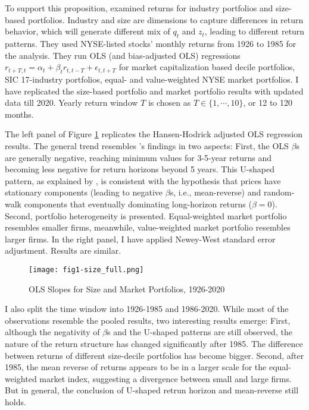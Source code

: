 To support this proposition, \citeauthor{fama1988permanent} examined returns for industry portfolios and size-based portfolios. Industry and size are dimensions to capture differences in return behavior, which will generate different mix of $q_t$ and $z_t$,
leading to different return patterns. They used NYSE-listed stocks' monthly returns from 1926 to 1985 for the analysis. They run OLS (and bias-adjusted OLS) regressions $r_{t+T,t}=\alpha_t+ \beta_t r_{t,t-T}+\epsilon_{t,t+T}$ for market capitalization based decile portfolios,
SIC 17-industry portfolios, equal- and value-weighted NYSE market portfolios. I have replicated the size-based portfolio and market portfolio results with updated data till 2020. Yearly return window $T$ is chosen as $T\in\{1,\cdots,10\}$, or 12 to 120 months.

The left panel of Figure \ref{fig1-size_full} replicates the Hansen-Hodrick adjusted OLS regression results. The general trend resembles \citeauthor{fama1988permanent}'s findings in two aspects: First, the OLS $\beta$s are generally negative, reaching minimum values for 3-5-year returns and
becoming less negative for return horizons beyond 5 years. This U-shaped pattern, as explained by \citeauthor{fama1988permanent}, is consistent with the hypothesis that prices have stationary components (leading to negative $\beta$s, i.e., mean-reverse) and random-walk components that eventually
dominating long-horizon returns ($\beta=0$). Second, portfolio heterogeneity is presented. Equal-weighted market portfolio resembles smaller firms, meanwhile, value-weighted market portfolio resembles larger firms. In the right panel, I have applied Newey-West standard error adjustment. Results are similar.

\begin{figure}[ht]
    \texttt{[image: fig1-size\_full.png]}
    \centering
    \caption{OLS Slopes for Size and Market Portfolios, 1926-2020}\label{fig1-size_full}
\end{figure}

I also split the time window into 1926-1985 and 1986-2020. While most of the observations resemble the pooled results, two interesting results emerge: 
First, although the negativity of $\beta$s and the U-shaped patterns are still observed, the nature of the return structure has changed significantly after 1985. The difference between returns of different size-decile portfolios has become bigger.
Second, after 1985, the mean reverse of returns appears to be in a larger scale for the equal-weighted market index, suggesting a divergence between small and large firms. But in general, the conclusion of U-shaped retrun horizon and mean-reverse still holds.


